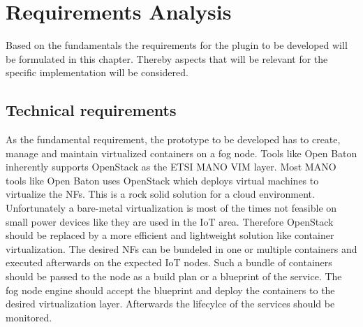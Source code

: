 \acresetall

\chapter{Requirements Analysis}
\label{chapter:requirements-analysis}
Based on the fundamentals the requirements for the plugin to be developed will be formulated in this chapter.
Thereby aspects that will be relevant for the specific implementation will be considered.


\section{Technical requirements}
\label{section:technical-requirements}
As the fundamental requirement, the prototype to be developed has to create, manage and maintain virtualized containers on a fog node.
Tools like Open Baton inherently supports OpenStack as the \ac{ETSI} \ac{MANO} \ac{VIM} layer.
Most \ac{MANO} tools like Open Baton uses OpenStack which deploys virtual machines to virtualize the \acp{NF}.
This is a rock solid solution for a cloud environment.
Unfortunately a bare-metal virtualization is most of the times not feasible on small power devices like they are used in the \ac{IoT} area.
Therefore OpenStack should be replaced by a more efficient and lightweight solution like container virtualization.
The desired \acp{NF} can be bundeled in one or multiple containers and executed afterwards on the expected \ac{IoT} nodes.
Such a bundle of containers should be passed to the node as a build plan or a blueprint of the service.
The fog node engine should accept the blueprint and deploy the containers to the desired virtualization layer.
Afterwards the lifecylce of the services should be monitored.

